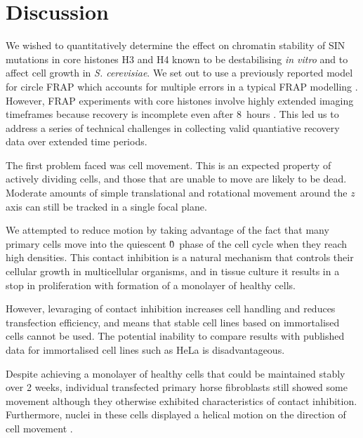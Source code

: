 \section{Discussion}

    We wished to quantitatively determine the effect on chromatin stability
    of SIN mutations in core histones H3 and H4 known 
    to be destabilising \textit{in vitro} and to affect cell growth in \textit{S. cerevisiae}.
    We set out to use a previously reported model for circle FRAP
    which accounts for multiple errors in a typical FRAP modelling .
    However, FRAP experiments with core histones involve highly extended imaging timeframes
    because recovery is incomplete even after 8~hours \citep{KimuraCook}.
    This led us to address a series of technical challenges in
    collecting valid quantiative recovery data over extended time periods.


    The first problem faced was cell movement.
    This is an expected property of actively dividing cells, 
    and those that are unable to move are likely to be dead.
    Moderate amounts of simple translational and rotational movement 
    around the $z$ axis can still be tracked in a single focal plane.

    We attempted to reduce motion by taking advantage of 
    the fact that many primary cells move into the quiescent \G0{}~phase 
    of the cell cycle when they reach high densities. 
    This contact inhibition is a natural mechanism that controls their cellular growth in 
    multicellular organisms, and in tissue culture it results in
    a stop in proliferation with formation of a monolayer of healthy cells.

    However, levaraging of contact inhibition increases cell handling and reduces transfection efficiency,
    and means that stable cell lines based on immortalised cells cannot be used. 
    The potential inability to compare results with published data for 
    immortalised cell lines such as HeLa is disadvantageous.

    Despite achieving a monolayer of healthy cells that could be maintained stably over 2 weeks,
    individual transfected primary horse fibroblasts still showed some movement
    although they otherwise exhibited characteristics of contact inhibition.
    Furthermore, nuclei in these cells displayed a helical motion on the direction of cell movement .

